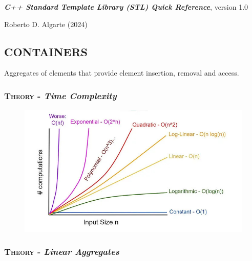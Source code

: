 \documentclass[10pt]{article}
\begin{document}
\noindent
{\Large{\textbf{\emph{C++ Standard Template Library (STL) Quick Reference}}, {\small version 1.0}}	
}

\noindent
{\small  Roberto D. Algarte (2024)}

\scriptsize
\begin{multicols*}{5}
{\color{Blue}
\subsection*{CONTAINERS}	
\noindent
Aggregates of elements that provide element insertion, removal and access.

\subsubsection*{\textsc{Theory} - \emph{Time Complexity}} 
\begin{figure}[H]
\begin{center}
\includegraphics[scale=.21]{complexity.jpg}	
\end{center}
\end{figure}

\subsubsection*{\textsc{Theory} - \emph{Linear Aggregates}} 

}
\end{multicols*}
\end{document}
